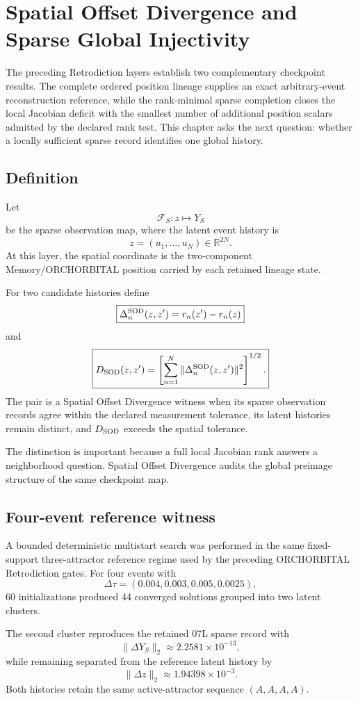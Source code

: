\chapter{Spatial Offset Divergence and Sparse Global Injectivity}

The preceding Retrodiction layers establish two complementary checkpoint results. The complete ordered position lineage supplies an exact arbitrary-event reconstruction reference, while the rank-minimal sparse completion closes the local Jacobian deficit with the smallest number of additional position scalars admitted by the declared rank test. This chapter asks the next question: whether a locally sufficient sparse record identifies one global history.

\section{Definition}

Let
\[
\mathcal F_S:z\mapsto Y_S
\]
be the sparse observation map, where the latent event history is
\[
z=(u_1,\ldots,u_N)\in\mathbb R^{2N}.
\]
At this layer, the spatial coordinate is the two-component Memory/ORCHORBITAL position carried by each retained lineage state.

For two candidate histories define
\[
\boxed{
\Delta_n^{\rm SOD}(z,z')=r_n(z')-r_n(z)
}
\]
and
\[
\boxed{
D_{\rm SOD}(z,z')
=
\left[
\sum_{n=1}^{N}
\|\Delta_n^{\rm SOD}(z,z')\|^2
\right]^{1/2}.
}
\]
The pair is a Spatial Offset Divergence witness when its sparse observation records agree within the declared measurement tolerance, its latent histories remain distinct, and $D_{\rm SOD}$ exceeds the spatial tolerance.

The distinction is important because a full local Jacobian rank answers a neighborhood question. Spatial Offset Divergence audits the global preimage structure of the same checkpoint map.

\section{Four-event reference witness}

A bounded deterministic multistart search was performed in the same fixed-support three-attractor reference regime used by the preceding ORCHORBITAL Retrodiction gates. For four events with
\[
\Delta\tau=(0.004,0.003,0.005,0.0025),
\]
60 initializations produced 44 converged solutions grouped into two latent clusters.

The second cluster reproduces the retained 07L sparse record with
\[
\|\Delta Y_S\|_2
\approx2.2581\times10^{-13},
\]
while remaining separated from the reference latent history by
\[
\|\Delta z\|_2
\approx1.94398\times10^{-3}.
\]
Both histories retain the same active-attractor sequence $(A,A,A,A)$.

